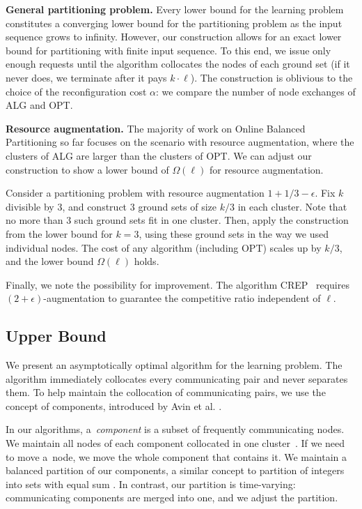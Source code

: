 \documentclass[a4paper,anonymous,USenglish]{lipics-v2019}
\newcommand{\OPT}{\textsf{OPT}\xspace}
\newcommand{\ALG}{\textsf{ALG}\xspace}
\begin{document}
\noindent
\textbf{General partitioning problem.}
Every lower bound for the learning problem constitutes a converging lower bound for the partitioning problem as the input sequence grows to infinity.
However, our construction allows for an exact lower bound for partitioning with finite input sequence.
To this end, we issue only enough requests until the algorithm collocates the nodes of each ground set (if it never does, we terminate after it pays $k\cdot \ell$).
The construction is oblivious to the choice of the reconfiguration cost $\alpha$: we compare the 	number of node exchanges of \ALG and \OPT.



\noindent
\textbf{Resource augmentation.}
The majority of work on Online Balanced Partitioning so far \cite{repartition-disc,sigmetrics19_partitioning} focuses on the scenario with resource augmentation, where the clusters of \ALG are larger than the clusters of \OPT.
We can adjust our construction to show a lower bound of $\Omega(\ell)$ for resource augmentation.

Consider a partitioning problem with resource augmentation $1+1/3-\epsilon$.
Fix $k$ divisible by $3$, and construct $3$ ground sets of size $k/3$ in each cluster.
Note that no more than $3$ such ground sets fit in one cluster.
Then, apply the construction from the lower bound for $k=3$, using these ground sets in the way we used individual nodes.
The cost of any algorithm (including \OPT) scales up by $k/3$, and the lower bound $\Omega(\ell)$ holds.

Finally, we note the possibility for improvement. The algorithm CREP~\cite{repartition-disc} requires $(2+\epsilon)$-augmentation to guarantee the competitive ratio independent of $\ell$.

\subsection{Upper Bound}
\label{sec:ppl}

We present an asymptotically optimal algorithm for the learning problem.
The algorithm immediately collocates every communicating pair and never separates them.
To help maintain the collocation of communicating pairs, we use the concept of components, introduced by Avin et al. \cite{repartition-disc}.

In our algorithms, a~\emph{component} is a subset of frequently communicating nodes.
We maintain all nodes of each component collocated in one cluster~\cite{repartition-disc}.
If we need to move a~node, we move the whole component that contains it.
We maintain a balanced partition of our components, a similar concept to partition of integers into sets with equal sum \cite{integer-partitions-book}.
In contrast, our partition is time-varying: communicating components are merged into one, and we adjust the partition.
\end{document}
